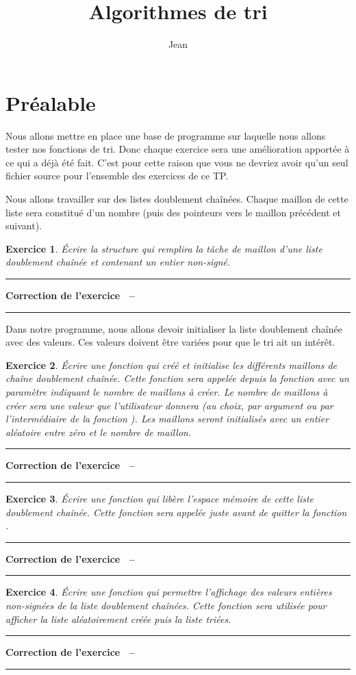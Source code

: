 \documentclass[a4paper]{article}
\title{Algorithmes de tri}
\author{Jean \Nom{Simard}}
\date{\Date[l]{05}{11}{2008}}
\newtheorem{Exo}{Exercice}
\newenvironment{Correction}{\par\tiny\blue\rule[1ex]{\textwidth}{1pt}\par\normalsize\textbf{Correction de l'exercice~\theExo{} -- }}{\par\tiny\blue\rule[1ex]{\textwidth}{1pt}\par}
\begin{document}
	\maketitle
	\section{Préalable}
		Nous allons mettre en place une base de programme sur laquelle nous allons tester nos fonctions de tri.
		Donc chaque exercice sera une amélioration apportée à ce qui a déjà été fait.
		C'est pour cette raison que vous ne devriez avoir qu'un seul fichier source pour l'ensemble des exercices de ce TP.

		Nous allons travailler sur des listes doublement chaînées.
		Chaque maillon de cette liste sera constitué d'un nombre (puis des pointeurs vers le maillon précédent et suivant).
		\begin{Exo}
			Écrire la structure qui remplira la tâche de maillon d'une liste doublement chaînée et contenant un entier non-signé.
		\end{Exo}
		\begin{Correction}
		\end{Correction}

		Dans notre programme, nous allons devoir initialiser la liste doublement chaînée avec des valeurs.
		Ces valeurs doivent être variées pour que le tri ait un intérêt.
		\begin{Exo}
			Écrire une fonction qui créé et initialise les différents maillons de chaîne doublement chaînée.
			Cette fonction sera appelée depuis la fonction  avec un paramètre indiquant le nombre de maillons à créer.
			Le nombre de maillons à créer sera une valeur que l'utilisateur donnera (au choix, par argument ou par l'intermédiaire de la fonction ).
			Les maillons seront initialisés avec un entier aléatoire entre zéro et le nombre de maillon.
		\end{Exo}
		\begin{Correction}
		\end{Correction}
		\begin{Exo}
			Écrire une fonction qui libère l'espace mémoire de cette liste doublement chaînée.
			Cette fonction sera appelée juste avant de quitter la fonction .
		\end{Exo}
		\begin{Correction}
		\end{Correction}
		\begin{Exo}
			Écrire une fonction qui permettre l'affichage des valeurs entières non-signées de la liste doublement chaînées.
			Cette fonction sera utilisée pour afficher la liste aléatoirement créée puis la liste triées.
		\end{Exo}
		\begin{Correction}
		\end{Correction}
		
\end{document}
